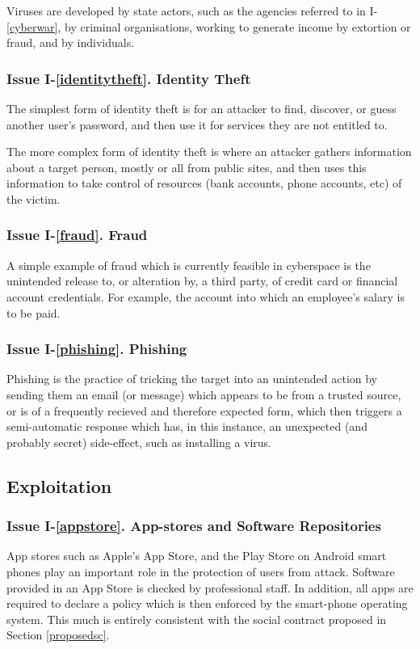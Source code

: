 Viruses are developed by state actors, such as the agencies
referred to in I-\ref{cyberwar}, by criminal organisations, working
to generate income by extortion or fraud, and by individuals.

\subsubsection*{Issue I-\ref{identitytheft}. {Identity Theft}}\label{identitytheftsol}
%
The simplest form of identity theft is for an attacker to find, discover,
or guess another user's password, and then use it for services
they are not entitled to. 

The more complex form of identity theft is where an attacker gathers
information about a target person, mostly or all from public
sites, and then uses this information to take control of resources
(bank accounts, phone accounts, etc) of the victim. 

\subsubsection*{Issue I-\ref{fraud}. {Fraud}}\label{fraudsol}
%
A simple example of fraud which is currently feasible in cyberspace is
the unintended release to, or alteration by, a third party, of credit card or financial account
credentials. For example, the account into which an employee's salary is to
be paid.

\subsubsection*{Issue I-\ref{phishing}. {Phishing}}\label{phishingsol}
%
Phishing is the practice of tricking the target into an unintended action
by sending them an email (or message) which appears to be from a trusted
source, or is of a frequently recieved and therefore expected form, which
then triggers a semi-automatic response which has, in this instance, an
unexpected (and probably secret) side-effect, such as installing a virus.

\subsection{Exploitation}\label{exploitationsec}
\subsubsection*{Issue I-\ref{appstore}. {App-stores and Software Repositories}}\label{appstoresol}
%
App stores such as Apple's App Store, and the Play Store on Android smart phones
play an important role in the protection of users from attack. Software
provided in an App Store is checked by professional staff. In addition, all apps
are required to declare a policy which is then enforced by the smart-phone
operating system. This much is entirely consistent with the social contract
proposed in Section \ref{proposedsc}.

